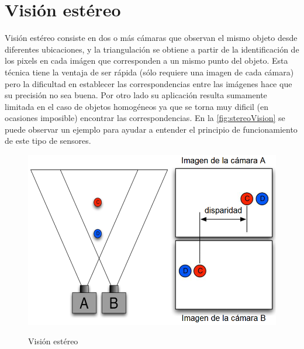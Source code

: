 \section{Visión estéreo}
Visión estéreo consiste en dos o más cámaras que observan el mismo objeto desde diferentes ubicaciones, y la triangulación se obtiene a partir de la identificación de los pixels en cada imágen que corresponden a un mismo punto del objeto. Esta técnica tiene la ventaja de ser rápida (sólo requiere una imagen de cada cámara) pero la dificultad en establecer las correspondencias entre las imágenes hace que su precisión no sea buena. Por otro lado su aplicación resulta sumamente limitada en el caso de objetos homogéneos ya que se torna muy dificil (en ocasiones imposible) encontrar las correspondencias. En la \autoref{fig:stereoVision} se puede observar un ejemplo para ayudar a entender el principio de funcionamiento de este tipo de sensores.


\begin{figure}[!bth]
    \myfloatalign
        {\includegraphics[width=0.8\linewidth]{images/stereoVision2}}
        \caption{Visión estéreo}
        \label{fig:stereoVision}
\end{figure}

